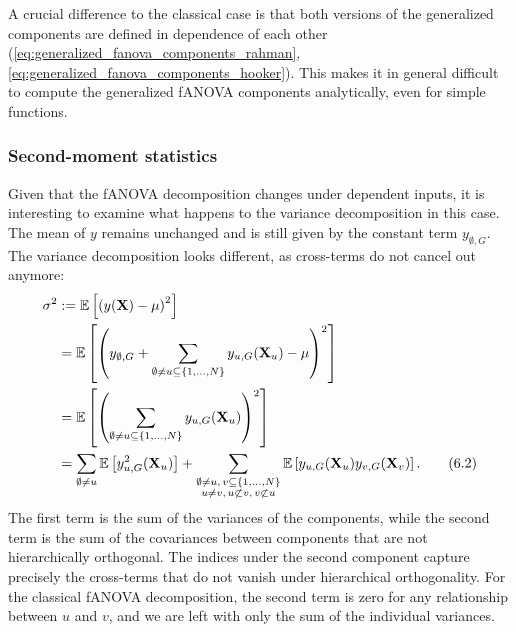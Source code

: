 A crucial difference to the classical case is that both versions of the generalized components are defined in dependence of each other (\autoref{eq:generalized_fanova_components_rahman}, \autoref{eq:generalized_fanova_components_hooker}).
This makes it in general difficult to compute the generalized fANOVA components analytically, even for simple functions.


\subsubsection{Second-moment statistics}
Given that the fANOVA decomposition changes under dependent inputs, it is interesting to examine what happens to the variance decomposition in this case.
The mean of $y$ remains unchanged and is still given by the constant term \( y_{\emptyset,G} \). The variance decomposition looks different, as cross-terms do not cancel out anymore:
\begin{align}
\sigma^2 
&:= \mathbb{E}\left[ \left( y(\mathbf{X}) - \mu \right)^2 \right] \notag \\
&= \mathbb{E} \left[ \left( y_{\emptyset,G} + \sum_{\emptyset \ne u \subseteq \{1,\dots,N\}} y_{u,G}(\mathbf{X}_u) - \mu \right)^2 \right] \notag \\
&= \mathbb{E} \left[ \left( \sum_{\emptyset \ne u \subseteq \{1,\dots,N\}} y_{u,G}(\mathbf{X}_u) \right)^2 \right] \notag \\
&= \sum_{\emptyset \ne u} \mathbb{E} \left[ y_{u,G}^2(\mathbf{X}_u) \right]
+ \sum_{\substack{\emptyset \ne u,\,v \subseteq \{1,\dots,N\} \\ u \ne v,\, u \not\subset v,\, v \not\subset u}} 
\mathbb{E} \left[ y_{u,G}(\mathbf{X}_u) y_{v,G}(\mathbf{X}_v) \right].
\tag{6.2}
\end{align}
The first term is the sum of the variances of the components, while the second term is the sum of the covariances between components that are not hierarchically orthogonal. The indices under the second component capture precisely the cross-terms that do not vanish under hierarchical orthogonality. For the classical fANOVA decomposition, the second term is zero for any relationship between $u$ and $v$, and we are left with only the sum of the individual variances.



